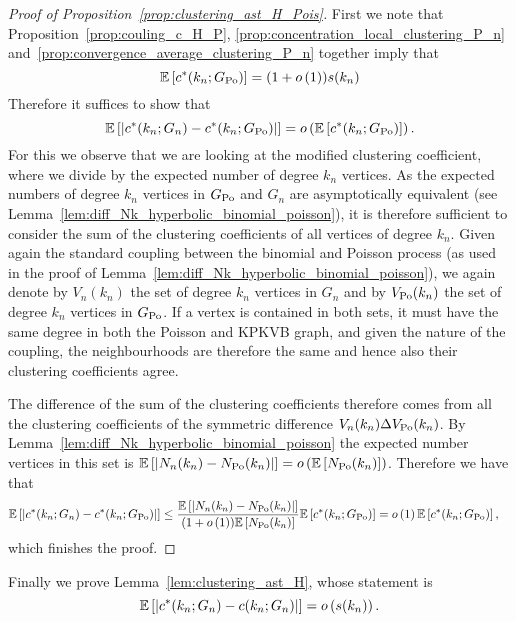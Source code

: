 \begin{proof}[Proof of Proposition~\ref{prop:clustering_ast_H_Pois}]
First we note that Proposition~\ref{prop:couling_c_H_P}, \ref{prop:concentration_local_clustering_P_n} and~\ref{prop:convergence_average_clustering_P_n} together imply that
\[
	\mathbb{E}\left[c^\ast(k_n; G_{{\mathrm{Po}}})\right] = (1+o\left(1\right))s(k_n)
\]
Therefore it suffices to show that
\[
	\mathbb{E}\left[\left|c^\ast(k_n; G_n) - c^\ast(k_n; G_{{\mathrm{Po}}})\right|\right] = o\left(\mathbb{E}\left[c^\ast(k_n; G_{{\mathrm{Po}}})\right]\right).
\]
For this we observe that we are looking at the modified clustering coefficient, where we divide by the expected number of degree $k_n$ vertices. As the expected numbers of degree $k_n$ vertices in $G_{{\mathrm{Po}}}$ and $G_n$ are asymptotically equivalent (see Lemma~\ref{lem:diff_Nk_hyperbolic_binomial_poisson}), it is therefore sufficient to consider the sum of the clustering coefficients of all vertices of degree $k_n$.
Given again the standard coupling between the binomial and Poisson process (as used in the proof of Lemma~\ref{lem:diff_Nk_hyperbolic_binomial_poisson}), we again denote by $V_n(k_n)$ the set of degree $k_n$ vertices in $G_n$ and by $V_{{\mathrm{Po}}}(k_n)$ the set of degree $k_n$ vertices in $G_{{\mathrm{Po}}}$. If a vertex is contained in both sets, it must have the same degree in both the Poisson and KPKVB graph, and given the nature of the coupling, the neighbourhoods are therefore the same and hence also their clustering coefficients agree.

The difference of the sum of the clustering coefficients therefore comes from all the clustering coefficients of the symmetric difference $V_n(k_n) \Delta V_{{\mathrm{Po}}}(k_n)$. By Lemma~\ref{lem:diff_Nk_hyperbolic_binomial_poisson} the expected number vertices in this set is $\mathbb{E}\left[\left|N_{n}(k_n) - N_{{\mathrm{Po}}}(k_n)\right|\right] = o\left(\mathbb{E}\left[N_{{\mathrm{Po}}}(k_n)\right]\right)$. Therefore we have that
\begin{align*}
	\mathbb{E}\left[\left|c^\ast(k_n; G_n) - c^\ast(k_n; G_{{\mathrm{Po}}})\right|\right]
	&\le \frac{\mathbb{E}\left[\left|N_{n}(k_n)-N_{{\mathrm{Po}}}(k_n)\right|\right]}{(1+o\left(1\right))\mathbb{E}\left[N_{{\mathrm{Po}}}(k_n)\right]} \mathbb{E}\left[c^\ast(k_n; G_{{\mathrm{Po}}})\right]
	= o\left(1\right)\mathbb{E}\left[c^\ast(k_n; G_{{\mathrm{Po}}})\right],
\end{align*}
which finishes the proof.
\end{proof}

Finally we prove Lemma~\ref{lem:clustering_ast_H}, whose statement is
\[
	\mathbb{E}\left[\left|c^\ast(k_n; G_n) - c(k_n; G_n)\right|\right] = o\left(s(k_n)\right).
\]


